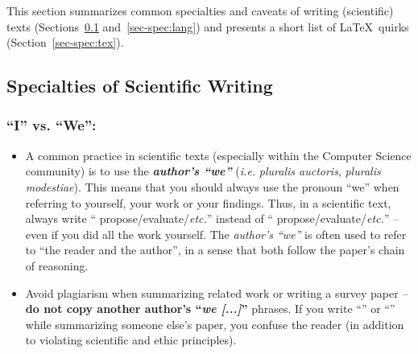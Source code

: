 \documentclass[11pt,a4paper]{article}
\begin{document}
This section summarizes common specialties and caveats of writing (scientific) texts (Sections~\ref{sec-spec:sci} and~\ref{sec-spec:lang}) and presents a short list of \LaTeX~quirks (Section~\ref{sec-spec:tex}).


\subsection{Specialties of Scientific Writing}
\label{sec-spec:sci}

\subsubsection*{``I'' vs. ``We'':}
\begin{itemize}
\item A common practice in scientific texts (especially within the Computer 
Science community) is to use the \emph{\textbf{author's ``we''}} (\emph{i.e.} 
\emph{pluralis auctoris}, \emph{pluralis modestiae}).
  This means that you should always use the pronoun ``we'' when referring to yourself, your work or your findings.
  Thus, in a scientific text, always write `` propose/evaluate/\emph{etc.}'' instead of `` propose/evaluate/\emph{etc.}'' -- even if you did all the work yourself.
  The \emph{author's ``we''} is often used to refer to ``the reader and the author'', in a sense that both follow the paper's chain of reasoning.
  
\item Avoid plagiarism when summarizing related work or writing a survey paper 
-- \textbf{do not copy another author's ``\emph{we [...]}''} phrases.
  If you write ``'' or ``'' while summarizing someone else's paper, you confuse the reader (in addition to violating scientific and ethic principles).
\end{itemize}
\end{document}
